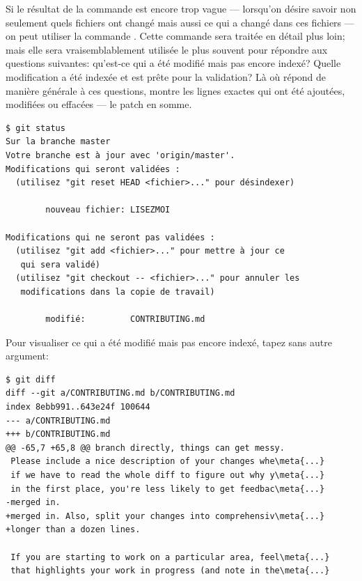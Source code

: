 Si le résultat de la commande  est encore trop vague --- lorsqu'on désire savoir non seulement quels fichiers ont changé mais aussi ce qui a changé dans ces fichiers --- on peut utiliser la commande .
Cette commande sera traitée en détail plus loin; mais elle sera vraisemblablement utilisée le plus souvent pour répondre aux questions suivantes: qu'est-ce qui a été modifié mais pas encore indexé? Quelle modification a été indexée et est prête pour la validation? Là où  répond de manière générale à ces questions,  montre les lignes exactes qui ont été ajoutées, modifiées ou effacées --- le patch en somme.
\begin{Schunk}
\begin{Verbatim}
$ git status
Sur la branche master
Votre branche est à jour avec 'origin/master'.
Modifications qui seront validées :
  (utilisez "git reset HEAD <fichier>..." pour désindexer)

        nouveau fichier: LISEZMOI

Modifications qui ne seront pas validées :
  (utilisez "git add <fichier>..." pour mettre à jour ce
   qui sera validé)
  (utilisez "git checkout -- <fichier>..." pour annuler les
   modifications dans la copie de travail)

        modifié:         CONTRIBUTING.md
\end{Verbatim}
\end{Schunk}

Pour visualiser ce qui a été modifié mais pas encore indexé, tapez  sans autre argument:
\begin{Schunk}
\begin{Verbatim}[commandchars=\\\{\}]
$ git diff
diff --git a/CONTRIBUTING.md b/CONTRIBUTING.md
index 8ebb991..643e24f 100644
--- a/CONTRIBUTING.md
+++ b/CONTRIBUTING.md
@@ -65,7 +65,8 @@ branch directly, things can get messy.
 Please include a nice description of your changes whe\meta{...}
 if we have to read the whole diff to figure out why y\meta{...}
 in the first place, you're less likely to get feedbac\meta{...}
-merged in.
+merged in. Also, split your changes into comprehensiv\meta{...}
+longer than a dozen lines.

 If you are starting to work on a particular area, feel\meta{...}
 that highlights your work in progress (and note in the\meta{...}
\end{Verbatim}
\end{Schunk}

